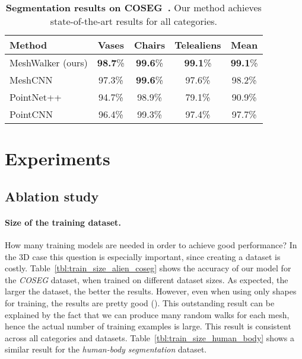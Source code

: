 \documentclass[acmtog]{acmart}
\begin{document}
\begin{table}[htb]\caption{{\bf Segmentation results on COSEG~\cite{wang2012active}.}
Our method achieves state-of-the-art results for all categories.
} 
\begin{center}
 \begin{tabular}{||l c c c c||} 
 \hline
 Method & Vases  & Chairs & Telealiens & Mean\\ [0.5ex] 
 \hline\hline\hline
 MeshWalker (ours) & \textbf{98.7}\% & \textbf{99.6}\% & \textbf{99.1}\% & \textbf{99.1}\% \\ 
 \hline
 MeshCNN & 97.3\% & \textbf{99.6}\% & 97.6\% & 98.2\% \\
 \hline\hline
 PointNet++ & 94.7\% & 98.9\% & 79.1\% & 90.9\% \\
 \hline
 PointCNN~\cite{li2018pointcnn} & 96.4\% & 99.3\% & 97.4\% & 97.7\% \\
 \hline
\end{tabular}
\label{tbl:coseg}
\end{center}
\end{table}



\section{Experiments}
\label{sec:experiments}


\subsection{Ablation study}

\paragraph{Size of the training dataset.}
\label{subsec:size_training_set}
How many training models are needed in order to achieve good performance?
In the 3D case this question is especially important, since creating a dataset is costly.
Table~\ref{tbl:train_size_alien_coseg} shows the accuracy of our model for the {\em COSEG} dataset, when trained on different dataset sizes.
As expected, the larger the dataset, the better the results.
However, even when using only  shapes for training, the results are pretty good (). 
This outstanding result can be explained by the fact that 
we can produce many random walks for each mesh, hence the actual number of training examples is large. 
This result is consistent across all categories and datasets.
Table~\ref{tbl:train_size_human_body} shows a similar result for the  {\em human-body segmentation} dataset.
\end{document}
